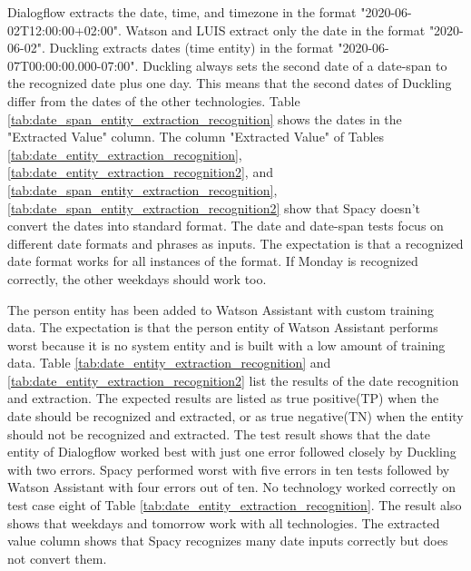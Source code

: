 Dialogflow extracts the date, time, and timezone in the format "2020-06-02T12:00:00+02:00".
Watson and LUIS extract only the date in the format "2020-06-02".
Duckling extracts dates (time entity) in the format "2020-06-07T00:00:00.000-07:00".
Duckling always sets the second date of a date-span to the recognized date plus one day.
This means that the second dates of Duckling differ from the dates of the other technologies.
Table \ref{tab:date_span_entity_extraction_recognition} shows the dates in the "Extracted Value" column.
The column "Extracted Value" of Tables \ref{tab:date_entity_extraction_recognition},
\ref{tab:date_entity_extraction_recognition2},
and \ref{tab:date_span_entity_extraction_recognition},
\ref{tab:date_span_entity_extraction_recognition2} show that Spacy doesn't convert the dates into standard format.
The date and date-span tests focus on different date formats and phrases as inputs.
The expectation is that a recognized date format works for all instances of the format.
If Monday is recognized correctly, the other weekdays should work too. 

The person entity has been added to Watson Assistant with custom training data.
The expectation is that the person entity of Watson Assistant performs worst because it is no system entity and is built with a low amount of training data.
Table \ref{tab:date_entity_extraction_recognition} and \ref{tab:date_entity_extraction_recognition2} list the results of the date recognition and extraction.
The expected results are listed as true positive(TP) when the date should be recognized and extracted, or as true negative(TN) when the entity should not be recognized and extracted.
The test result shows that the date entity of Dialogflow worked best with just one error followed closely by Duckling with two errors.
Spacy performed worst with five errors in ten tests followed by Watson Assistant with four errors out of ten.
No technology worked correctly on test case eight of Table \ref{tab:date_entity_extraction_recognition}.
The result also shows that weekdays and tomorrow work with all technologies.
The extracted value column shows that Spacy recognizes many date inputs correctly but does not convert them.

